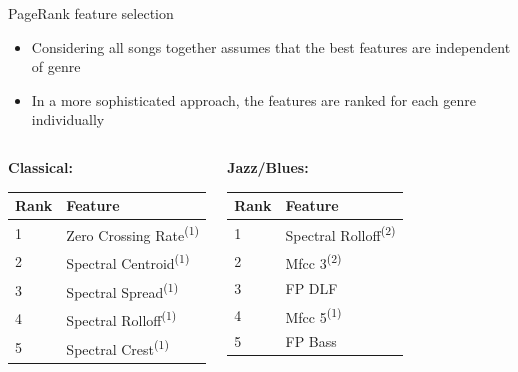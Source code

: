 \documentclass[xcolor=dvipsnames,t]{beamer} %
\newcommand{\tss}[1]{\textsuperscript{#1}}
\begin{document}
\begin{frame}{PageRank feature selection}
\begin{itemize}
\item Considering all songs together assumes that the best features are independent of genre
\item In a more sophisticated approach, the features are ranked for each genre individually
\end{itemize}

\begin{columns}[t]
\begin{center}
\textbf{Classical:}
\begin{tabular}{|l|l|}
\hline
Rank & Feature \\ \hline
1 & Zero Crossing Rate\tss{(1)} \\ \hline
2 & Spectral Centroid\tss{(1)} \\ \hline
3 & Spectral Spread\tss{(1)} \\ \hline
4 & Spectral Rolloff\tss{(1)} \\ \hline
5 & Spectral Crest\tss{(1)} \\ \hline
\end{tabular}
\end{center}
\begin{center}
\textbf{Jazz/Blues:}
\begin{tabular}{|l|l|}
\hline
Rank & Feature \\ \hline
1 & Spectral Rolloff\tss{(2)} \\ \hline
2 & Mfcc 3\tss{(2)} \\ \hline
3 & FP DLF \\ \hline
4 & Mfcc 5\tss{(1)} \\ \hline
5 & FP Bass \\ \hline
\end{tabular}
\end{center}
\end{columns}
\end{frame}
\end{document}
